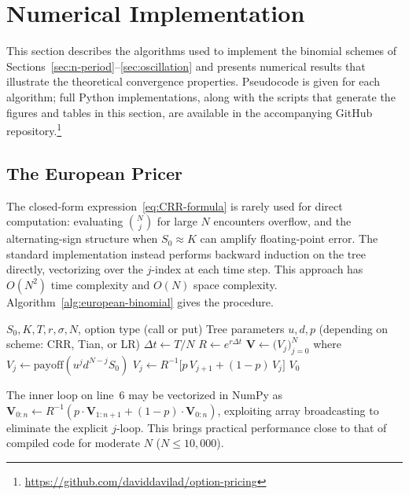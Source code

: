 \documentclass[11pt,a4paper]{article}
\newif\ifincludenumerics
\theoremstyle{plain}
\theoremstyle{definition}
\begin{document}
\ifincludenumerics
\section{Numerical Implementation}
\label{sec:numerics}

This section describes the algorithms used to implement the binomial
schemes of Sections~\ref{sec:n-period}--\ref{sec:oscillation} and
presents numerical results that illustrate the theoretical convergence
properties. Pseudocode is given for each algorithm; full Python
implementations, along with the scripts that generate the figures and
tables in this section, are available in the accompanying GitHub
repository.\footnote{\url{https://github.com/daviddavilad/option-pricing}}

\subsection{The European Pricer}
\label{subsec:european-pricer}

The closed-form expression~\eqref{eq:CRR-formula} is rarely used for
direct computation: evaluating $\binom{N}{j}$ for large $N$ encounters
overflow, and the alternating-sign structure when $S_0 \approx K$ can
amplify floating-point error. The standard implementation instead
performs backward induction on the tree directly, vectorizing over the
$j$-index at each time step. This approach has $O(N^2)$ time complexity
and $O(N)$ space complexity. Algorithm~\ref{alg:european-binomial} gives
the procedure.

\begin{algorithm}[H]
\caption{European call/put pricing via backward induction}
\label{alg:european-binomial}
\begin{algorithmic}[1]
\Require $S_0, K, T, r, \sigma, N$, option type (call or put)
\Require Tree parameters $u, d, p$ (depending on scheme: CRR, Tian, or LR)
\State $\Delta t \gets T / N$
\State $R \gets e^{r \Delta t}$
\State $\mathbf{V} \gets \bigl(V_j\bigr)_{j=0}^{N}$ where
       $V_j \gets \mathrm{payoff}(u^j d^{N-j} S_0)$
        \State $V_j \gets R^{-1}\bigl[p\, V_{j+1} + (1-p)\, V_j\bigr]$
    \EndFor
\EndFor
\State \Return $V_0$
\end{algorithmic}
\end{algorithm}

The inner loop on line~6 may be vectorized in NumPy as
$\mathbf{V}_{0:n} \leftarrow R^{-1}(p \cdot \mathbf{V}_{1:n+1} + (1-p) \cdot \mathbf{V}_{0:n})$,
exploiting array broadcasting to eliminate the explicit $j$-loop. This
brings practical performance close to that of compiled code for
moderate $N$ ($N \leq 10{,}000$).
\end{document}
